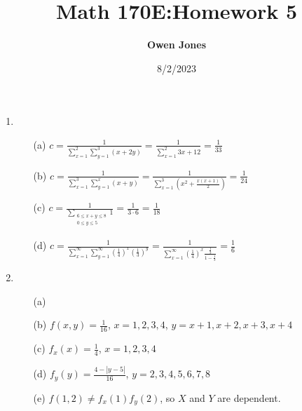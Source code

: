 \documentclass{article}
\title{\bf Math 170E:\@ Homework 5}
\date{8/2/2023}
\author{\bf Owen Jones}
\begin{document}
\maketitle

\begin{enumerate}[label=\textbf{Problem \arabic*.}]
    \item \begin{itemize}
        \item [(a)] $c=\frac{1}{\displaystyle \sum_{x=1}^{2}\sum_{y=1}^{3}(x+2y)}=\frac{1}{\displaystyle \sum_{x=1}^{2}3x+12}=\frac{1}{33}$
        \item [(b)] $c=\frac{1}{\displaystyle \sum_{x=1}^{3}\sum_{y=1}^{x}(x+y)}=\frac{1}{\displaystyle \sum_{x=1}^{3}(x^2+\frac{x(x+1)}{2})}=\frac{1}{24}$
        \item [(c)] $c=\frac{1}{\displaystyle \sum_{\begin{matrix}
            6\le x+y\le 8\\
            0\le y \le 5\\
        \end{matrix}}1}=\frac{1}{3\cdot6}=\frac{1}{18}$
        \item [(d)] $c=\frac{1}{\displaystyle \sum_{x=1}^{\infty}\sum_{y=1}^{\infty}{(\frac{1}{4})}^x{(\frac{1}{3})}^y}=\frac{1}{\displaystyle \sum_{x=1}^{\infty}{(\frac{1}{4})}^x\frac{\frac{1}{3}}{1-\frac{1}{3}}}=\frac{1}{6}$
    \end{itemize}
        \item \begin{itemize}
            \item [(a)] 
            \item [(b)] $f(x,y)=\frac{1}{16}$, $x=1,2,3,4$, $y=x+1,x+2,x+3,x+4$
            \item [(c)] $f_x(x)=\frac{1}{4}$, $x=1,2,3,4$
            \item [(d)] $f_y(y)=\frac{4-|y-5|}{16}$, $y=2,3,4,5,6,7,8$
            \item [(e)] $f(1,2)\neq f_x(1)f_y(2)$, so $X$ and $Y$ are dependent. 
        \end{itemize}

\end{enumerate}
\end{document}
